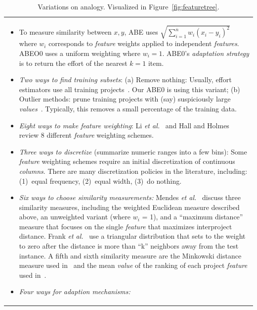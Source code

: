 \documentclass[10pt,conference]{IEEEtran}
\newcommand{\fig}[1]{Figure~\ref{fig:#1}}
\begin{document}
\begin{table}[!t]
\caption{Variations on analogy. 
 Visualized in
\fig{featuretree}.}\label{tbl:aben}

\begin{tabular}{|p{.94\linewidth}|}\hline

\begin{itemize}[leftmargin=0.1in]
\item
To measure    similarity between  $x,y$, 
ABE uses $\sqrt{\sum_{i=1}^n w_i(x_i-y_i)^2}$ where  $w_i$ corresponds to {\em feature} weights applied to independent {\em features}. ABEO0 uses a uniform weighting where $w_i=1$.
ABE0's {\em adaptation strategy} is to return the  effort   of the nearest $k=1$   item.
\item
{\em Two ways to find training subsets}:
(a) Remove nothing: Usually, effort estimators use all training projects~\cite{chang1974finding}. Our ABE0 is using this variant;
(b) Outlier methods: prune training projects with (say) suspiciously large {\em values}~\cite{keung2008analogy}. Typically, this removes a small percentage of the training data.
\item
{\em Eight ways to make feature weighting}:
Li {\it et al.}~\cite{li2009study} and Hall and Holmes~\cite{hall2003benchmarking} review 8 different {\em feature} weighting schemes.
\item
{\em Three ways to discretize} (summarize numeric ranges into a few bins):
Some {\em feature} weighting schemes require an initial discretization of continuous {\em columns}. There are many discretization policies in the literature, including:
(1)~equal frequency,
(2)~equal width, 
(3)~do nothing.
\item
{\em Six ways to choose similarity measurements:}
Mendes {\it et al.}~\cite{mendes2003comparative} discuss three similarity measures, including the weighted Euclidean measure described above, an unweighted variant (where $w_i$ = 1), and a ``maximum distance'' measure that focuses on the single {\em feature} that maximizes interproject distance. Frank {\it et al.}~\cite{frank2002locally} use a triangular distribution that sets to the weight to zero after the distance is more than ``k'' neighbors away from the test instance. A fifth and sixth similarity measure are the Minkowski distance measure used in~\cite{angelis2000simulation} and the mean {\em value} of the ranking of each project {\em feature} used in~\cite{walkerden1999empirical}.
\item
{\em Four ways for adaption mechanisms:} 

\end{itemize}
\end{tabular}
\end{table}
\end{document}

